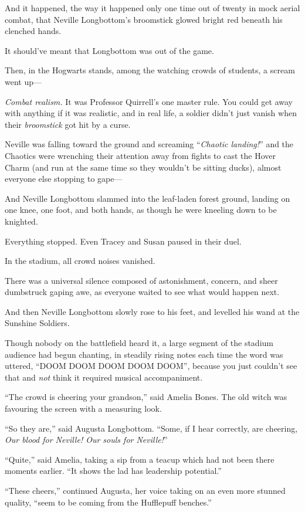And it happened, the way it happened only one time out of twenty in mock aerial
combat, that Neville Longbottom’s broomstick glowed bright red beneath his
clenched hands.

It should’ve meant that Longbottom was out of the game.

Then, in the Hogwarts stands, among the watching crowds of students, a scream
went up—

\emph{Combat realism.} It was Professor Quirrell’s one master rule. You could
get away with anything if it was realistic, and in real life, a soldier didn’t
just vanish when their \emph{broomstick} got hit by a curse.

Neville was falling toward the ground and screaming “\emph{Chaotic landing!}”
and the Chaotics were wrenching their attention away from fights to cast the
Hover Charm (and run at the same time so they wouldn’t be sitting ducks),
almost everyone else stopping to gape—

And Neville Longbottom slammed into the leaf-laden forest ground, landing on
one knee, one foot, and both hands, as though he were kneeling down to be
knighted.

Everything stopped. Even Tracey and Susan paused in their duel.

In the stadium, all crowd noises vanished.

There was a universal silence composed of astonishment, concern, and sheer
dumbstruck gaping awe, as everyone waited to see what would happen next.

And then Neville Longbottom slowly rose to his feet, and levelled his wand at
the Sunshine Soldiers.

Though nobody on the battlefield heard it, a large segment of the stadium
audience had begun chanting, in steadily rising notes each time the word was
uttered, “DOOM DOOM DOOM DOOM DOOM”, because you just couldn’t see that and
\emph{not} think it required musical accompaniment.

“The crowd is cheering your grandson,” said Amelia Bones. The old witch was
favouring the screen with a measuring look.

“So they are,” said Augusta Longbottom. “Some, if I hear correctly, are
cheering, \emph{Our blood for Neville! Our souls for Neville!}”

“Quite,” said Amelia, taking a sip from a teacup which had not been there
moments earlier. “It shows the lad has leadership potential.”

“These cheers,” continued Augusta, her voice taking on an even more stunned
quality, “seem to be coming from the Hufflepuff benches.”

